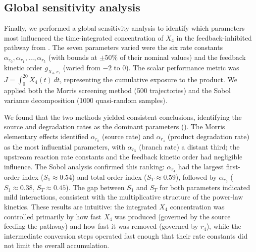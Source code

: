 \documentclass[11pt]{article}
\begin{document}
\subsection{Global sensitivity analysis}\label{sec:ex-sensitivity}
Finally, we performed a global sensitivity analysis to identify which parameters most influenced the time-integrated concentration of $X_4$ in the feedback-inhibited pathway from . The seven parameters varied were the six rate constants $\alpha_{r_0}, \alpha_{r_1}, \ldots, \alpha_{r_5}$ (with bounds at $\pm 50\%$ of their nominal values) and the feedback kinetic order $g_{X_4,r_1}$ (varied from $-2$ to $0$). The scalar performance metric was $J = \int_0^{20} X_4(t)\,dt$, representing the cumulative exposure to the product. We applied both the Morris screening method (500 trajectories) and the Sobol variance decomposition (1000 quasi-random samples).

We found that the two methods yielded consistent conclusions, identifying the source and degradation rates as the dominant parameters (). The Morris elementary effects identified $\alpha_{r_0}$ (source rate) and $\alpha_{r_4}$ (product degradation rate) as the most influential parameters, with $\alpha_{r_5}$ (branch rate) a distant third; the upstream reaction rate constants and the feedback kinetic order had negligible influence. The Sobol analysis confirmed this ranking: $\alpha_{r_4}$ had the largest first-order index ($S_1 \approx 0.54$) and total-order index ($S_T \approx 0.59$), followed by $\alpha_{r_0}$ ($S_1 \approx 0.38$, $S_T \approx 0.45$). The gap between $S_1$ and $S_T$ for both parameters indicated mild interactions, consistent with the multiplicative structure of the power-law kinetics. These results are intuitive: the integrated $X_4$ concentration was controlled primarily by how fast $X_4$ was produced (governed by the source feeding the pathway) and how fast it was removed (governed by $r_4$), while the intermediate conversion steps operated fast enough that their rate constants did not limit the overall accumulation.
\end{document}
